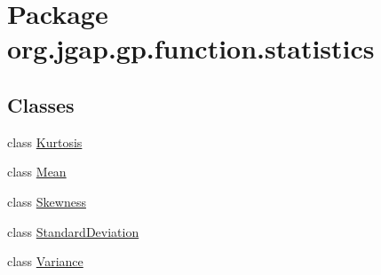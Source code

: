 \hypertarget{namespaceorg_1_1jgap_1_1gp_1_1function_1_1statistics}{\section{Package org.\-jgap.\-gp.\-function.\-statistics}
\label{namespaceorg_1_1jgap_1_1gp_1_1function_1_1statistics}
}
\subsection*{Classes}
\begin{DoxyCompactItemize}
\item 
class \hyperlink{classorg_1_1jgap_1_1gp_1_1function_1_1statistics_1_1_kurtosis}{Kurtosis}
\item 
class \hyperlink{classorg_1_1jgap_1_1gp_1_1function_1_1statistics_1_1_mean}{Mean}
\item 
class \hyperlink{classorg_1_1jgap_1_1gp_1_1function_1_1statistics_1_1_skewness}{Skewness}
\item 
class \hyperlink{classorg_1_1jgap_1_1gp_1_1function_1_1statistics_1_1_standard_deviation}{Standard\-Deviation}
\item 
class \hyperlink{classorg_1_1jgap_1_1gp_1_1function_1_1statistics_1_1_variance}{Variance}
\end{DoxyCompactItemize}
